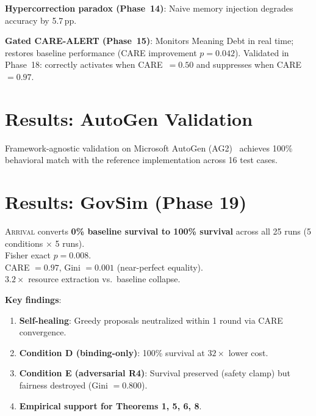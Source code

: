 \documentclass[11pt,a4paper]{article}
\newcommand{\arrival}{\textsc{Arrival}\xspace}
\newcommand{\pp}{\,pp\xspace}
\begin{document}
\textbf{Hypercorrection paradox (Phase~14)}: Naive memory injection
degrades accuracy by 5.7\pp.

\textbf{Gated CARE-ALERT (Phase~15)}: Monitors Meaning Debt in
real time; restores baseline performance (CARE improvement $p=0.042$).
Validated in Phase~18: correctly activates when CARE~$=0.50$ and
suppresses when CARE~$=0.97$.

\section{Results: AutoGen Validation}\label{sec:autogen}

Framework-agnostic validation on Microsoft AutoGen
(AG2)~\cite{wu2023autogen} achieves
100\% behavioral match with the reference implementation across
16 test cases.

\section{Results: GovSim (Phase 19)}\label{sec:govsim}

\begin{resultbox}
\arrival converts \textbf{0\% baseline survival to 100\% survival}
across all 25 runs (5 conditions $\times$ 5 runs).\\
Fisher exact $p = 0.008$.\\
CARE $= 0.97$, Gini $= 0.001$ (near-perfect equality).\\
$3.2\times$ resource extraction vs.\ baseline collapse.
\end{resultbox}

\textbf{Key findings}:
\begin{enumerate}
  \item \textbf{Self-healing}: Greedy proposals neutralized within
    1 round via CARE convergence.
  \item \textbf{Condition D (binding-only)}: 100\% survival at
    $32\times$ lower cost.
  \item \textbf{Condition E (adversarial R4)}: Survival preserved
    (safety clamp) but fairness destroyed (Gini $= 0.800$).
  \item \textbf{Empirical support for Theorems 1, 5, 6, 8}.
\end{enumerate}
\end{document}
